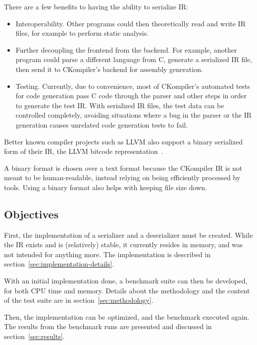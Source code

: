 \documentclass[lettersize,journal]{IEEEtran}
\begin{document}
    There are a few benefits to having the ability to serialize IR:
    \begin{itemize}
        \item Interoperability.
        Other programs could then theoretically read and write IR files, for example to perform static analysis.
        \item Further decoupling the frontend from the backend.
        For example, another program could parse a different language from C, generate a serialized IR file, then send
        it to CKompiler's backend for assembly generation.
        \item Testing.
        Currently, due to convenience, most of CKompiler's automated tests for code generation pass C code through
        the parser and other steps in order to generate the test IR\@.
        With serialized IR files, the test data can be controlled completely, avoiding situations where a bug in the
        parser or the IR generation causes unrelated code generation tests to fail.
    \end{itemize}

    Better known compiler projects such as LLVM also support a binary serialized form of their IR, the LLVM bitcode
    representation~\cite{llvm,llvm-ir}.

    A binary format is chosen over a text format because the CKompiler IR is not meant to be human-readable, instead
    relying on being efficiently processed by tools.
    Using a binary format also helps with keeping file size down.

    \subsection{Objectives}\label{subsec:objectives}

    First, the implementation of a serializer and a deserializer must be created.
    While the IR exists and is (relatively) stable, it currently resides in memory, and was not intended for anything
    more.
    The implementation is described in section~\ref{sec:implementation-details}.

    With an initial implementation done, a benchmark suite can then be developed, for both CPU time and memory.
    Details about the methodology and the content of the test suite are in section~\ref{sec:methodology}.

    Then, the implementation can be optimized, and the benchmark executed again.
    The results from the benchmark runs are presented and discussed in section~\ref{sec:results}.
\end{document}
